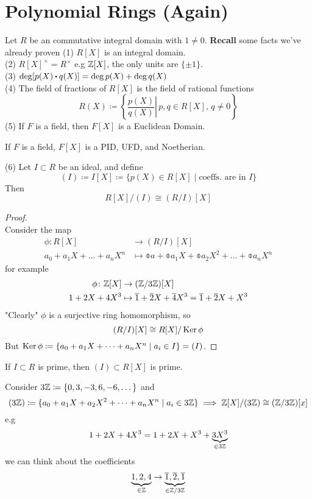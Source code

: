 \documentclass[../Main.tex]{subfiles}
\begin{document}
\section*{Polynomial Rings (Again)}

Let $R$ be an commutative integral domain with $1\ne 0$. \textbf{Recall} some facts we've already proven
(1) $R[X]$ is an integral domain.\\
(2) $R[X]^\times=R^\times$ e.g $\mathbb{Z}[X]$, the only units are $\{\pm 1\}$.\\
(3) $\deg[p(X)\rdot q(X)]=\deg p(X)+ \deg q(X)$\\
(4) The field of fractions of $R[X]$ is the field of rational functions
	\[R(X)\coloneqq \left\{ \left. \frac{p(X)}{q(X)} \right| \, p,q\in R[X],\, q\ne 0\right\}\]
(5) If $F$ is a field, then $F[X]$ is a Euclidean Domain.
	\begin{crl}[title = {\texorpdfstring{$F[X]$}{F[X]} is PID, UFD, and Noetherian}]
		If $F$ is a field, $F[X]$ is a PID, UFD, and Noetherian.
	\end{crl}
(6) Let $I\subset R$ be an ideal, and define
	\[(I)\coloneqq I[X] \coloneqq \{p(X)\in R[X]\mid \text{coeffs. are in } I\}\]
	Then 
	\[R[X]/(I)\cong (R/I)[X]\]
\begin{proof}~\\
	Consider the map
	\begin{align*}
	\phi\colon R[X] &\to (R/I)[X] \\
	a_0+a_1X+\dots+a_nX^n &\mapsto \obar{a}+\obar{a_1}X+\obar{a_2}X^2+\dots+\obar{a_n}X^n
	\end{align*}
	for example
	\begin{align*}
	\phi\colon \mathbb{Z}[X] &\to (\mathbb{Z}/3\mathbb{Z})[X] \\
	1+2X+4X^3 &\mapsto \overline{1}+\overline{2}X+\overline{4}X^3=\overline{1}+\overline{2}X+X^3
	\end{align*}
	"Clearly" $\phi$ is a surjective ring homomorphism, so
	\[(R/I)[X]\cong R[X]/\operatorname{Ker} \phi\]
	But $\operatorname{Ker}\phi\coloneqq\{a_0+a_1X+\dots+a_nX^n\mid a_i\in I\}=(I)$.
\end{proof}
\begin{crl}
		If $I\subset R$ is prime, then $(I)\subset R[X]$ is prime.
\end{crl}
\begin{example}
	Consider $3\mathbb{Z} \coloneqq \{0,3,-3,6,-6,\dots\}$ and
	\[(3\mathbb{Z})\coloneqq \{a_0+a_1X+a_2X^2+\dots+a_nX^n\mid a_i\in 3\mathbb{Z}\} \implies \mathbb{Z}[X]/(3\mathbb{Z})\cong (\mathbb{Z}/3\mathbb{Z})[x]\]
	e.g 
	\[1+2X+4X^3=1+2X+X^3+\underbrace{3X^3}_{\in 3\mathbb{Z}}\]
	we can think about the coefficients
	\[\underbrace{1,2,4}_{\in \mathbb{Z}}\to \underbrace{\overline{1},\overline{2},\overline{1}}_{\in \mathbb{Z}/3\mathbb{Z}}\]
\end{example}
\end{document}
